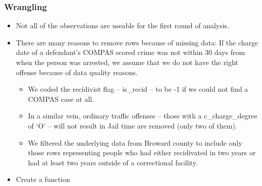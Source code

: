 \documentclass[
]{book}
\providecommand{\tightlist}{%
  \setlength{\itemsep}{0pt}\setlength{\parskip}{0pt}}
\begin{document}
\hypertarget{wrangling}{%
\subsubsection{Wrangling}\label{wrangling}}

\begin{itemize}
\tightlist
\item
  Not all of the observations are useable for the first round of analysis.
\item
  There are many reasons to remove rows because of missing data:
  If the charge date of a defendant's COMPAS scored crime was not within 30 days from when the person was arrested, we assume that we do not have the right offense because of data quality reasons.

  \begin{itemize}
  \tightlist
  \item
    We coded the recidivist flag -- is\_recid -- to be -1 if we could not find a COMPAS case at all.
  \item
    In a similar vein, ordinary traffic offenses -- those with a c\_charge\_degree of `O' -- will not result in Jail time are removed (only two of them).
  \item
    We filtered the underlying data from Broward county to include only those rows representing people who had either recidivated in two years or had at least two years outside of a correctional facility.
  \end{itemize}
\item
  Create a function
\end{itemize}
\end{document}
